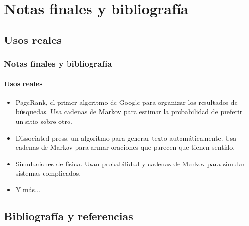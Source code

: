 \documentclass[../main.tex]{subfiles}
\begin{document}
\newcommand{\SECTIONE}{Notas finales y bibliografía}
\section{\SECTIONE}

\newcommand{\SECTIONEA}{Usos reales}
\subsection{\SECTIONEA}

\begin{frame}
  \frametitle{\SECTIONE}
  \framesubtitle{\SECTIONEA}

  \begin{itemize}
    \item PageRank, el primer algoritmo de Google para organizar los resultados de búsquedas. Usa cadenas de Markov para estimar la probabilidad de preferir un sitio sobre otro.
    \item Dissociated press, un algoritmo para generar texto automáticamente. Usa cadenas de Markov para armar oraciones que parecen que tienen sentido.
    \item Simulaciones de física. Usan probabilidad y cadenas de Markov para simular sistemas complicados.
    \item Y más...
  \end{itemize}
\end{frame}

\newcommand{\SECTIONEB}{Bibliografía y referencias}
\subsection{\SECTIONEB}
\end{document}

